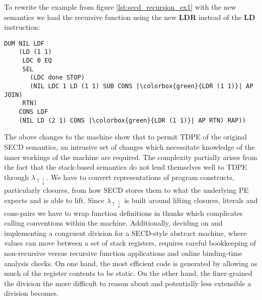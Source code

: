 \documentclass[a4paper,12pt,twoside,openright]{report}
\theoremstyle{definition}
\newcommand{\mslang}{$\lambda_{\uparrow\downarrow}$}
\begin{document}
To rewrite the example from figure \ref{lst:secd_recursion_ex1} with the new semantics we load the recursive function using the new \textbf{LDR} instead of the \textbf{LD} instruction:
\begin{verbatim}
DUM NIL LDF
    (LD (1 1)
     LDC 0 EQ
     SEL
       (LDC done STOP)
       (NIL LDC 1 LD (1 1) SUB CONS |\colorbox{green}{LDR (1 1)}| AP JOIN)
     RTN)
    CONS LDF
    (NIL LD (2 1) CONS |\colorbox{green}{LDR (1 1)}| AP RTN) RAP))
\end{verbatim}

The above changes to the machine show that to permit TDPE of the original SECD semantics, an intrusive set of changes which necessitate knowledge of the inner workings of the machine are required. The complexity partially arises from the fact that the stack-based semantics do not lend themselves well to TDPE through \mslang. We have to convert representations of program constructs, particularly closures, from how SECD stores them to what the underlying PE expects and is able to lift. Since \mslang{} is built around lifting closures, literals and cons-pairs we have to wrap function definitions in thunks which complicates calling conventions within the machine. Additionally, deciding on and implementing a congruent division for a SECD-style abstract machine, where values can move between a set of stack registers, requires careful bookkeeping of non-recursive versus recursive function applications and online binding-time analysis checks. On one hand, the most efficient code is generated by allowing as much of the register contents to be static. On the other hand, the finer-grained the division the more difficult to reason about and potentially less extensible a division becomes.
\end{document}
